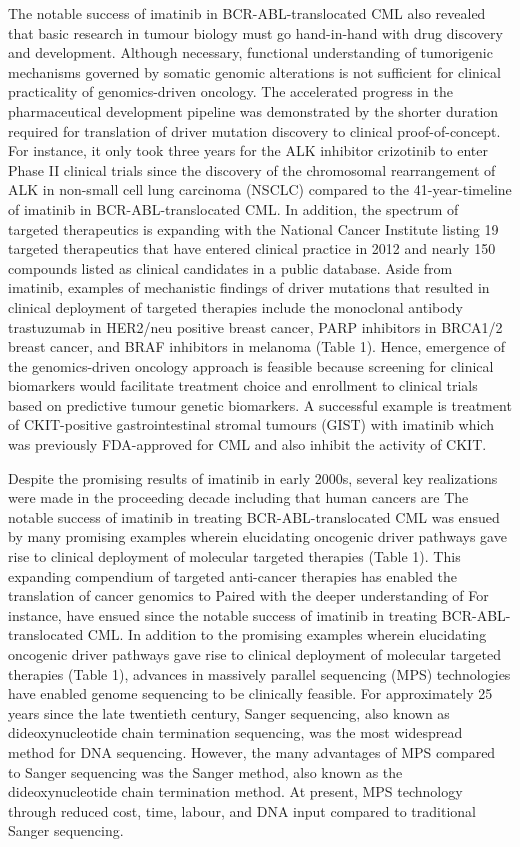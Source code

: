 The notable success of imatinib in BCR-ABL-translocated CML also revealed that basic research in tumour biology must go hand-in-hand with drug discovery and development. Although necessary, functional understanding of tumorigenic mechanisms governed by somatic genomic alterations is not sufficient for clinical practicality of genomics-driven oncology. The accelerated progress in the pharmaceutical development pipeline was demonstrated by the shorter duration required for translation of driver mutation discovery to clinical proof-of-concept. For instance, it only took three years for the ALK inhibitor crizotinib to enter Phase II clinical trials since the discovery of the chromosomal rearrangement of ALK in non-small cell lung carcinoma (NSCLC) compared to the 41-year-timeline of imatinib in BCR-ABL-translocated CML. In addition, the spectrum of targeted therapeutics is expanding with the National Cancer Institute listing 19 targeted therapeutics that have entered clinical practice in 2012 and nearly 150 compounds listed as clinical candidates in a public database. Aside from imatinib, examples of mechanistic findings of driver mutations that resulted in clinical deployment of targeted therapies include the monoclonal antibody trastuzumab in HER2/neu positive breast cancer, PARP inhibitors in BRCA1/2 breast cancer, and BRAF inhibitors in melanoma (Table 1). Hence, emergence of the genomics-driven oncology approach is feasible because screening for clinical biomarkers would facilitate treatment choice and enrollment to clinical trials based on predictive tumour genetic biomarkers. A successful example is treatment of CKIT-positive gastrointestinal stromal tumours (GIST) with imatinib which was previously FDA-approved for CML and also inhibit the activity of CKIT.

Despite the promising results of imatinib in early 2000s, several key realizations were made in the proceeding decade including that human cancers are
The notable success of imatinib in treating BCR-ABL-translocated CML was ensued by many promising examples wherein elucidating oncogenic driver pathways gave rise to clinical deployment of molecular targeted therapies (Table 1). This expanding compendium of targeted anti-cancer therapies has enabled the translation of cancer genomics to Paired with the deeper understanding of For instance, have ensued since the notable success of imatinib in treating BCR-ABL-translocated CML. In addition to the promising examples wherein elucidating oncogenic driver pathways gave rise to clinical deployment of molecular targeted therapies (Table 1), advances in massively parallel sequencing (MPS) technologies have enabled genome sequencing to be clinically feasible. For approximately 25 years since the late twentieth century, Sanger sequencing, also known as dideoxynucleotide chain termination sequencing, was the most widespread method for DNA sequencing. However, the many advantages of MPS compared to Sanger sequencing was the Sanger method, also known as the dideoxynucleotide chain termination method. At present, MPS technology through reduced cost, time, labour, and DNA input compared to traditional Sanger sequencing.

